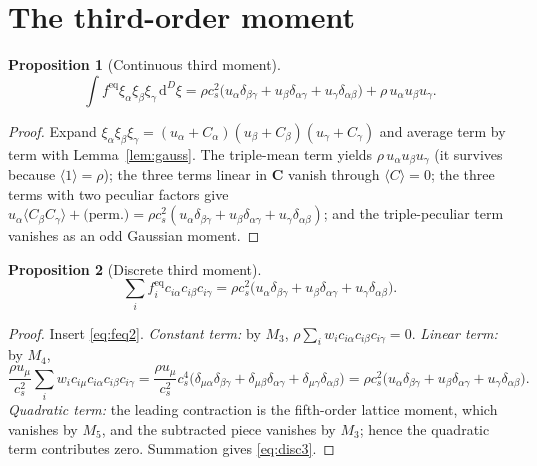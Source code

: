 \documentclass[preprint,11pt]{elsarticle}
\newtheorem{proposition}{Proposition}
\newcommand{\cs}{c_s}
\newcommand{\eq}{\mathrm{eq}}
\newcommand{\dd}{\,\mathrm{d}}
\newcommand{\sumi}{\sum_i}
\begin{document}
\section{The third-order moment}
\label{sec:third}

\begin{proposition}[Continuous third moment]
\label{prop:cont3}
\begin{equation}
\int f^{\eq}\xi_\alpha\xi_\beta\xi_\gamma\dd^{D}\xi
=\rho\cs^{2}\big(u_\alpha\delta_{\beta\gamma}
+u_\beta\delta_{\alpha\gamma}
+u_\gamma\delta_{\alpha\beta}\big)
+\rho\,u_\alpha u_\beta u_\gamma.
\label{eq:cont3}
\end{equation}
\end{proposition}

\begin{proof}
Expand $\xi_\alpha\xi_\beta\xi_\gamma
=(u_\alpha+C_\alpha)(u_\beta+C_\beta)(u_\gamma+C_\gamma)$ and average term by
term with Lemma~\ref{lem:gauss}. The triple-mean term yields
$\rho\,u_\alpha u_\beta u_\gamma$ (it survives because $\langle1\rangle=\rho$);
the three terms linear in $\mathbf{C}$ vanish through $\langle C\rangle=0$; the
three terms with two peculiar factors give
$u_\alpha\langle C_\beta C_\gamma\rangle+\text{(perm.)}
=\rho\cs^{2}(u_\alpha\delta_{\beta\gamma}+u_\beta\delta_{\alpha\gamma}
+u_\gamma\delta_{\alpha\beta})$; and the triple-peculiar term vanishes as an
odd Gaussian moment.
\end{proof}

\begin{proposition}[Discrete third moment]
\label{prop:disc3}
\begin{equation}
\sum_i f_i^{\eq}c_{i\alpha}c_{i\beta}c_{i\gamma}
=\rho\cs^{2}\big(u_\alpha\delta_{\beta\gamma}
+u_\beta\delta_{\alpha\gamma}
+u_\gamma\delta_{\alpha\beta}\big).
\label{eq:disc3}
\end{equation}
\end{proposition}

\begin{proof}
Insert \eqref{eq:feq2}. \emph{Constant term:} by $M_3$,
$\rho\sum_i w_i c_{i\alpha}c_{i\beta}c_{i\gamma}=0$.
\emph{Linear term:} by $M_4$,
\begin{equation*}
\frac{\rho u_\mu}{\cs^{2}}\sumi w_i
c_{i\mu}c_{i\alpha}c_{i\beta}c_{i\gamma}
=\frac{\rho u_\mu}{\cs^{2}}\cs^{4}
\big(\delta_{\mu\alpha}\delta_{\beta\gamma}
+\delta_{\mu\beta}\delta_{\alpha\gamma}
+\delta_{\mu\gamma}\delta_{\alpha\beta}\big)
=\rho\cs^{2}\big(u_\alpha\delta_{\beta\gamma}
+u_\beta\delta_{\alpha\gamma}+u_\gamma\delta_{\alpha\beta}\big).
\end{equation*}
\emph{Quadratic term:} the leading contraction is the fifth-order lattice
moment, which vanishes by $M_5$, and the subtracted piece vanishes by $M_3$;
hence the quadratic term contributes zero. Summation gives \eqref{eq:disc3}.
\end{proof}
\end{document}
